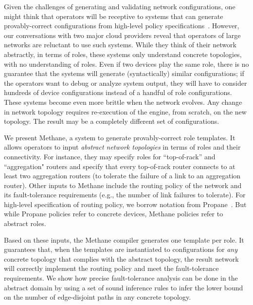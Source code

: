 \documentclass[numbers, 10pt, preprint]{sigplanconf}
\newcommand{\sysname}{{\small \sf Methane}\xspace}
\begin{document}

Given the challenges of generating and validating network configurations, one
might think that operators will be receptive to systems that can generate
provably-correct configurations from high-level policy
specifications~\cite{x,y,z,configassure,propane}. However, our conversations
with two major cloud providers reveal that operators of large networks are
reluctant to use such systems. While they think of their network abstractly, in
terms of roles, these systems only understand concrete topologies, with no understanding of roles.  Even if two devices play the same role,
there is no guarantee that the systems will generate (syntactically) similar
configurations; if the operators want to debug or analyze system output, they
will have to consider hundreds of device configurations instead of a handful of
role configurations. These systems become even more brittle when the network
evolves. Any change in network topology requires re-execution of the engine,
from scratch, on the new topology.  The result may be a completely different
set of configurations.

We present \sysname, a system to generate provably-correct role templates. It
allows operators to input \emph{abstract network topologies} in terms of roles
and their connectivity. For instance, they may specify roles for ``top-of-rack''
and ``aggregation" routers and specify that every top-of-rack router connects to
at least two aggregation routers (to tolerate the failure of a link to an
aggregation router). Other inputs to \sysname include the routing policy of the
network and its fault-tolerance requirements (e.g., the number of link failures
to tolerate). For high-level specification of routing policy, we borrow notation from
Propane~\cite{propane}. But while Propane policies refer to concrete devices, \sysname
policies refer to abstract roles.

Based on these inputs, the \sysname compiler generates one template per role. It
guarantees that, when the templates are instantiated to configurations for {\em
any} concrete topology that complies with the abstract topology, the result
network will correctly implement the routing policy and meet the fault-tolerance
requirements. We show how precise fault-tolerance analysis can be done in the abstract domain by using a set of sound inference rules to infer the lower bound on the number of edge-disjoint paths in any concrete topology.
\end{document}
